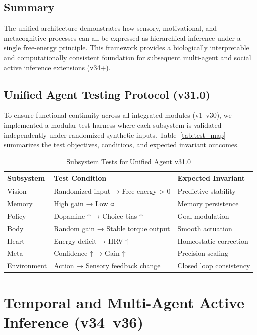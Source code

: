 \documentclass[9pt]{elife}
\begin{document}
\subsection{Summary}

The unified architecture demonstrates how sensory, motivational,
and metacognitive processes can all be expressed as hierarchical
inference under a single free-energy principle.
This framework provides a biologically interpretable and
computationally consistent foundation for subsequent
multi-agent and social active inference extensions (v34+).


\subsection{Unified Agent Testing Protocol (v31.0)}

To ensure functional continuity across all integrated modules (v1–v30),
we implemented a modular test harness where each subsystem is validated
independently under randomized synthetic inputs. Table~\ref{tab:test_map}
summarizes the test objectives, conditions, and expected invariant outcomes.

\begin{table}[h]
\centering
\caption{Subsystem Tests for Unified Agent v31.0}
\begin{tabular}{l l l}
\hline
Subsystem & Test Condition & Expected Invariant \\
\hline
Vision & Randomized input → Free energy > 0 & Predictive stability \\
Memory & High gain → Low α & Memory persistence \\
Policy & Dopamine ↑ → Choice bias ↑ & Goal modulation \\
Body & Random gain → Stable torque output & Smooth actuation \\
Heart & Energy deficit → HRV ↑ & Homeostatic correction \\
Meta & Confidence ↑ → Gain ↑ & Precision scaling \\
Environment & Action → Sensory feedback change & Closed loop consistency \\
\hline
\end{tabular}
\end{table}

\section{Temporal and Multi-Agent Active Inference (v34–v36)}
\end{document}
